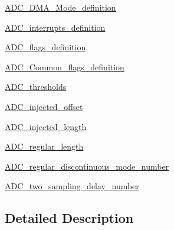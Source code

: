 \begin{DoxyCompactItemize}
\item 
\hyperlink{group___a_d_c___d_m_a___mode__definition}{A\-D\-C\-\_\-\-D\-M\-A\-\_\-\-Mode\-\_\-definition}
\item 
\hyperlink{group___a_d_c__interrupts__definition}{A\-D\-C\-\_\-interrupts\-\_\-definition}
\item 
\hyperlink{group___a_d_c__flags__definition}{A\-D\-C\-\_\-flags\-\_\-definition}
\item 
\hyperlink{group___a_d_c___common__flags__definition}{A\-D\-C\-\_\-\-Common\-\_\-flags\-\_\-definition}
\item 
\hyperlink{group___a_d_c__thresholds}{A\-D\-C\-\_\-thresholds}
\item 
\hyperlink{group___a_d_c__injected__offset}{A\-D\-C\-\_\-injected\-\_\-offset}
\item 
\hyperlink{group___a_d_c__injected__length}{A\-D\-C\-\_\-injected\-\_\-length}
\item 
\hyperlink{group___a_d_c__regular__length}{A\-D\-C\-\_\-regular\-\_\-length}
\item 
\hyperlink{group___a_d_c__regular__discontinuous__mode__number}{A\-D\-C\-\_\-regular\-\_\-discontinuous\-\_\-mode\-\_\-number}
\item 
\hyperlink{group___a_d_c__two__sampling__delay__number}{A\-D\-C\-\_\-two\-\_\-sampling\-\_\-delay\-\_\-number}
\end{DoxyCompactItemize}


\subsection{Detailed Description}
